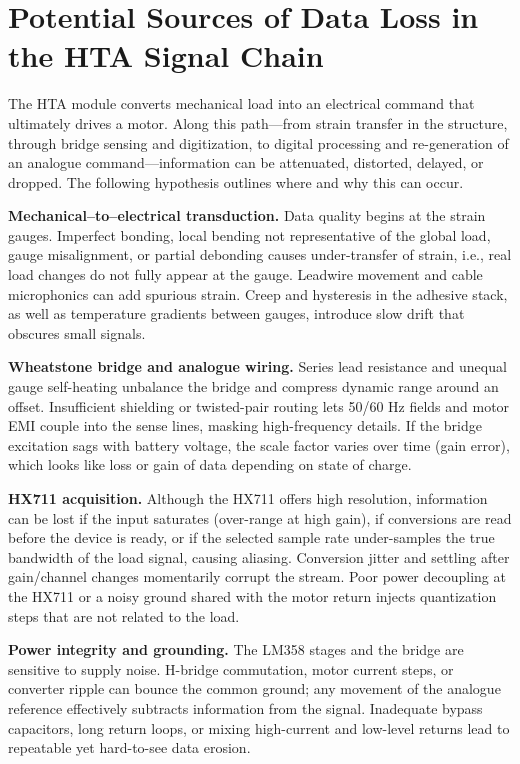 \section{Potential Sources of Data Loss in the HTA Signal Chain}

The HTA module converts mechanical load into an electrical command that ultimately drives a motor. Along this path—from strain transfer in the structure, through bridge sensing and digitization, to digital processing and re-generation of an analogue command—information can be attenuated, distorted, delayed, or dropped. The following hypothesis outlines where and why this can occur.

\textbf{Mechanical–to–electrical transduction.} Data quality begins at the strain gauges. Imperfect bonding, local bending not representative of the global load, gauge misalignment, or partial debonding causes under-transfer of strain, i.e., real load changes do not fully appear at the gauge. Leadwire movement and cable microphonics can add spurious strain. Creep and hysteresis in the adhesive stack, as well as temperature gradients between gauges, introduce slow drift that obscures small signals.

\textbf{Wheatstone bridge and analogue wiring.} Series lead resistance and unequal gauge self-heating unbalance the bridge and compress dynamic range around an offset. Insufficient shielding or twisted-pair routing lets 50/60 Hz fields and motor EMI couple into the sense lines, masking high-frequency details. If the bridge excitation sags with battery voltage, the scale factor varies over time (gain error), which looks like loss or gain of data depending on state of charge.

\textbf{HX711 acquisition.} Although the HX711 offers high resolution, information can be lost if the input saturates (over-range at high gain), if conversions are read before the device is ready, or if the selected sample rate under-samples the true bandwidth of the load signal, causing aliasing. Conversion jitter and settling after gain/channel changes momentarily corrupt the stream. Poor power decoupling at the HX711 or a noisy ground shared with the motor return injects quantization steps that are not related to the load.

\textbf{Power integrity and grounding.} The LM358 stages and the bridge are sensitive to supply noise. H-bridge commutation, motor current steps, or converter ripple can bounce the common ground; any movement of the analogue reference effectively subtracts information from the signal. Inadequate bypass capacitors, long return loops, or mixing high-current and low-level returns lead to repeatable yet hard-to-see data erosion.

